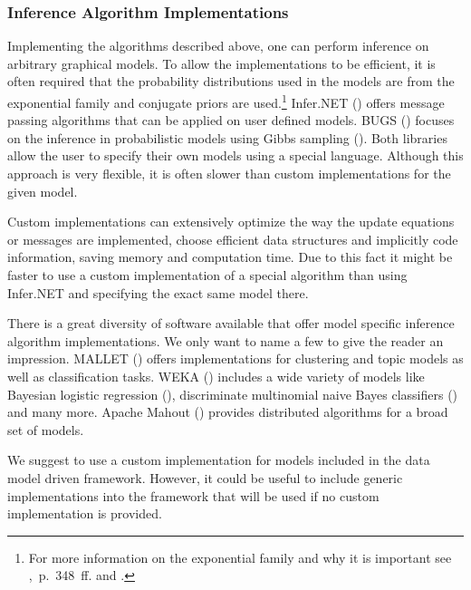 \subsubsection{Inference Algorithm Implementations}
\label{subsec:custom-inference}

Implementing the algorithms described above, one can perform inference on arbitrary graphical models. To allow the implementations to be efficient, it is often required that the probability distributions used in the models are from the exponential family and conjugate priors are used.\footnote{For more information on the exponential family and why it is important see \textcite{murphy2012machine},~p.~348~ff. and \textcite{andersen1970sufficiency}.} Infer.NET (\cite{InferNET12}) offers message passing algorithms that can be applied on user defined models. BUGS (\cite{lunn2009bugs}) focuses on the inference in probabilistic models using Gibbs sampling (\cite{geman1984stochastic}). Both libraries allow the user to specify their own models using a special language. Although this approach is very flexible, it is often slower than custom implementations for the given model.

Custom implementations can extensively optimize the way the update equations or messages are implemented, choose efficient data structures and implicitly code information, saving memory and computation time. Due to this fact it might be faster to use a custom implementation of a special algorithm than using Infer.NET and specifying the exact same model there.

There is a great diversity of software available that offer model specific inference algorithm implementations. We only want to name a few to give the reader an impression. MALLET (\cite{mccallum2002mallet}) offers implementations for clustering and topic models as well as classification tasks. WEKA (\cite{hall2009weka}) includes a wide variety of models like Bayesian logistic regression (\cite{genkin2007large}), discriminate multinomial naive Bayes classifiers (\cite{talia2005weka4ws}) and many more. Apache Mahout (\cite{mahout}) provides distributed algorithms for a broad set of models.

We suggest to use a custom implementation for models included in the data model driven framework. However, it could be useful to include generic implementations into the framework that will be used if no custom implementation is provided.
